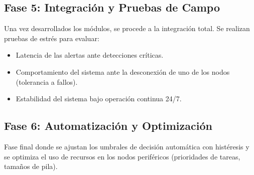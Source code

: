 \subsection{Fase 5: Integración y Pruebas de Campo}
Una vez desarrollados los módulos, se procede a la integración total. Se realizan pruebas de estrés para evaluar:
\begin{itemize}
    \item Latencia de las alertas ante detecciones críticas.
    \item Comportamiento del sistema ante la desconexión de uno de los nodos (tolerancia a fallos).
    \item Estabilidad del sistema bajo operación continua 24/7.
\end{itemize}

\subsection{Fase 6: Automatización y Optimización}
Fase final donde se ajustan los umbrales de decisión automática con histéresis y se optimiza el uso de recursos en los nodos periféricos (prioridades de tareas, tamaños de pila).